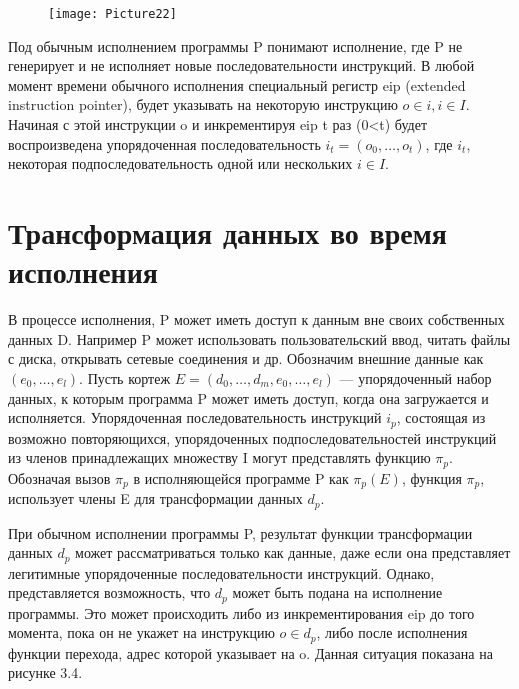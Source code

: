 \documentclass[oneside, final, 14pt]{extreport}
\begin{document}
\begin{figure}[t]
	\centering
	\texttt{[image: Picture22]}
	\caption{}
	\label{truck_figure}
\end{figure}

Под обычным исполнением программы P  понимают исполнение, где P не генерирует и не исполняет новые последовательности инструкций. В любой момент времени обычного исполнения специальный регистр eip (extended instruction pointer), будет указывать на некоторую инструкцию \(o \in i, i \in I\). Начиная с этой инструкции o и инкрементируя eip t раз (0<t) будет воспроизведена упорядоченная последовательность \(i_t=(o_0,\ldots ,o_t)\), где \(i_t\), некоторая подпоследовательность одной или нескольких \(i \in I\).

\section{Трансформация данных во время исполнения} 

В процессе исполнения, P может иметь доступ к данным вне своих собственных данных D. Например P может использовать пользовательский ввод, читать файлы с диска, открывать сетевые соединения и др. Обозначим внешние данные как \((e_0,\ldots, e_l)\). Пусть кортеж \(E=(d_0,\ldots , d_m, e_0, \dots ,e_l)\) --- упорядоченный набор данных, к которым программа P может иметь доступ, когда она загружается и исполняется. Упорядоченная последовательность инструкций \(i_p\), состоящая из возможно повторяющихся, упорядоченных подпоследовательностей инструкций из членов принадлежащих множеству I могут представлять функцию \(\pi _p\). Обозначая вызов \(\pi _p\) в исполняющейся программе P как \(\pi _p(E)\), функция \(\pi _p\), использует члены E для трансформации данных \(d _p\).


При обычном исполнении программы P, результат функции трансформации данных \(d_p\) может рассматриваться только как данные, даже если она представляет легитимные упорядоченные последовательности инструкций.  
Однако, представляется возможность, что \(d_p\) может быть подана на исполнение программы. Это может происходить либо из инкрементирования eip до того момента, пока он не укажет на инструкцию \(o \in d_p\), либо после исполнения функции перехода, адрес которой указывает на o. Данная ситуация показана на рисунке 3.4.
\end{document}
